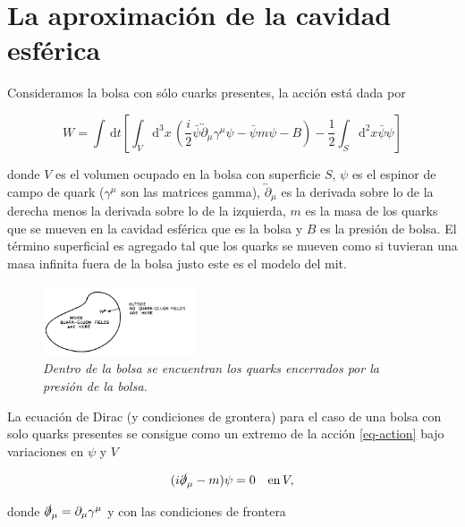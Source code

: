 \section{La aproximación de la cavidad esférica}

Consideramos la bolsa con sólo cuarks presentes, la acción está dada por

\begin{equation}\label{eq-action}
W = \int \, \mathrm{d}t \left[ \int_{V} \mathrm{d}^{3} x \, \left( \frac{i}{2} \bar{\psi} \overleftrightarrow{\partial}_{\mu} {\gamma}^{\mu} \psi - \bar{\psi} m \psi - B \right) - \frac{1}{2} \int_{S} \mathrm{d}^{2} x \bar{\psi} \psi\right]
\end{equation}

donde $V$ es el volumen ocupado en la bolsa con superficie $S$, $\psi$ es el espinor de campo de quark (${\gamma}^{\mu}$ son las matrices gamma), $\overleftrightarrow{\partial}_{\mu}$ es la derivada sobre lo de la derecha menos la derivada sobre lo de la izquierda, $m$ es la masa de los quarks que se mueven en la cavidad esférica que es la bolsa y $B$ es la presión de bolsa. El término superficial es agregado tal que los quarks se mueven como si tuvieran una masa infinita fuera de la bolsa justo este es el modelo del \acrshort{mit}.

\begin{figure}
\centering
\includegraphics[width=0.4\textwidth]{./Images/Bag model BC.png}
\caption[Diagrama de bolsa con condiciones de grontera]{\emph{Dentro de la bolsa se encuentran los quarks encerrados por la presión de la bolsa.}}
\label{fig: Bolsa BC}
\end{figure}

La ecuación de Dirac (y condiciones de grontera) para el caso de una bolsa con solo quarks presentes se consigue como un extremo de la acción \eqref{eq-action} bajo variaciones en $\psi$ y $V$

\begin{equation}\label{eq-deq}
( i \slashed{\partial}_{\mu} - m) \psi= 0 \quad \mathrm{en} \, V,
\end{equation}

donde $\slashed{\partial}_{\mu} = {\partial}_{\mu} {\gamma}^{\mu}$ y con las condiciones de frontera

